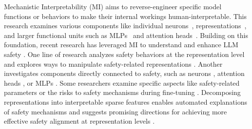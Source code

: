 Mechanistic Interpretability (MI) aims to reverse-engineer specific model functions or behaviors to make their internal workings human-interpretable. 
This research examines various components like individual neurons~\citep{gurnee2023finding, stolfo2024confidence}, representations~\citep{marks2024geometry,gurnee2024language}, and larger functional units such as MLPs~\citep{geva2021transformer, geva2022transformer} and attention heads~\citep{mcdougall2023copy, gould2024successor}.
Building on this foundation, recent research has leveraged MI to understand and enhance LLM safety \cite{bereska2024mechanistic}.
One line of research analyzes safety behaviors at the representation level and explores ways to manipulate safety-related representations \cite{leong2023self, zou2023representation, arditi2024refusal, cao2024nothing, lee2024programming, li2024rethinking, shen2024jailbreak}. Another investigates components directly connected to safety, such as neurons \cite{chen2024finding}, attention heads \cite{zhu2024locking, zhou2024role}, or MLPs \cite{lee2024mechanistic, luo2024jailbreak}. 
Some researchers examine specific aspects like safety-related parameters \cite{wei2024assessing, yi2024nlsr} or the risks to safety mechanisms during fine-tuning \cite{li2024safety, leong2024no}. 
Decomposing representations into interpretable sparse features enables automated explanations of safety mechanisms \cite{kirch2024features, templeton2024scaling} and suggests promising directions for achieving more effective safety alignment at representation levels \cite{liu2024aligning, yin2024direct, zou2024improving, rosati2024representation}.


